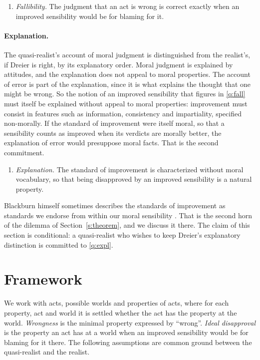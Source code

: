 \documentclass{situationist-preprint}
\begin{document}
\begin{enumerate}[label=(Q\arabic*)]
\item\label{q:fall} \emph{Fallibility.} The judgment that an act is wrong is correct exactly when an improved sensibility would be for blaming for it.
\end{enumerate}

\paragraph{Explanation.} The quasi-realist's account of moral judgment is distinguished from the realist's, if Dreier is right, by its explanatory order. Moral judgment is explained by attitudes, and the explanation does not appeal to moral properties. The account of error is part of the explanation, since it is what explains the thought that one might be wrong. So the notion of an improved sensibility that figures in \ref{q:fall} must itself be explained without appeal to moral properties: improvement must consist in features such as information, consistency and impartiality, specified non-morally. If the standard of improvement were itself moral, so that a sensibility counts as improved when its verdicts are morally better, the explanation of error would presuppose moral facts. That is the second commitment.

\begin{enumerate}[label=(Q\arabic*),resume]
\item\label{q:expl} \emph{Explanation.} The standard of improvement is characterized without moral vocabulary, so that being disapproved by an improved sensibility is a natural property.
\end{enumerate}

Blackburn himself sometimes describes the standards of improvement as standards we endorse from within our moral sensibility \citep{Blackburn1998}. That is the second horn of the dilemma of Section~\ref{s:theorem}, and we discuss it there. The claim of this section is conditional: a quasi-realist who wishes to keep Dreier's explanatory distinction is committed to \ref{q:expl}.

\section{Framework}\label{s:framework}

We work with acts, possible worlds and properties of acts, where for each property, act and world it is settled whether the act has the property at the world. \emph{Wrongness} is the minimal property expressed by \enquote{wrong}. \emph{Ideal disapproval} is the property an act has at a world when an improved sensibility would be for blaming for it there. The following assumptions are common ground between the quasi-realist and the realist.
\end{document}
